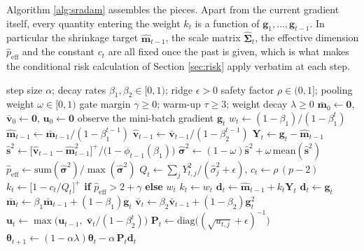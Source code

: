 \documentclass[a4paper,fleqn]{cas-dc}
\theoremstyle{plain}
\theoremstyle{definition}
\theoremstyle{remark}
\newcommand{\peff}{p_{\mathrm{eff}}}
\newcommand{\diag}{\mathrm{diag}}
\begin{document}
Algorithm \ref{alg:sradam} assembles the pieces. Apart from the current gradient itself, every quantity entering the weight $k_t$ is a function of $\bm g_1,\dots,\bm g_{t-1}$. In particular the shrinkage target $\hat{\bm m}_{t-1}$, the scale matrix $\widehat{\bm\Sigma}_t$, the effective dimension $\hat\peff$ and the constant $c_t$ are all fixed once the past is given, which is what makes the conditional risk calculation of Section \ref{sec:risk} apply verbatim at each step.

\begin{algorithm*}[t]
\caption{SR-Adam, applied blockwise}
\label{alg:sradam}
\begin{algorithmic}[1]
\Require step size $\alpha$; decay rates $\beta_1,\beta_2\in[0,1)$; ridge $\epsilon>0$
\Statex \hspace{1.2em} safety factor $\rho\in(0,1]$; pooling weight $\omega\in[0,1)$
\Statex \hspace{1.2em} gate margin $\gamma\ge0$; warm-up $\tau\ge3$; weight decay $\lambda\ge0$
\State $\bar{\bm m}_0\gets\bm 0$, $\bar{\bm v}_0\gets\bm 0$, $\bm u_0\gets\bm 0$
  \State observe the mini-batch gradient $\bm g_t$
  \State $w_t\gets(1-\beta_1)/(1-\beta_1^{t})$ 
    \State $\hat{\bm m}_{t-1}\gets\bar{\bm m}_{t-1}/(1-\beta_1^{t-1})$
    \State $\hat{\bm v}_{t-1}\gets\bar{\bm v}_{t-1}/(1-\beta_2^{t-1})$
    \State $\bm Y_t\gets\bm g_t-\hat{\bm m}_{t-1}$
      \State $\hat{\bm s}^2\gets\bigl[\hat{\bm v}_{t-1}-\hat{\bm m}_{t-1}^{2}\bigr]^{+}\big/\bigl(1-\phi_{t-1}(\beta_1)\bigr)$ 
      \State $\hat{\bm\sigma}^2\gets(1-\omega)\hat{\bm s}^2+\omega\,\mathrm{mean}(\hat{\bm s}^2)$ 
      \State $\hat\peff\gets\mathrm{sum}(\hat{\bm\sigma}^2)\big/\max(\hat{\bm\sigma}^2)$
      \State $Q_t\gets\sum_{j}Y^2_{t,j}/(\hat\sigma^2_{j}+\epsilon)$, \quad $c_t\gets\rho\,(p-2)$
      \State $k_t\gets\bigl[1-c_t/Q_t\bigr]^{+}$ \textbf{if} $\hat\peff>2+\gamma$ \textbf{else} $w_t$
    \Else
      \State $k_t\gets w_t$
    \EndIf
    \State $\bm d_t\gets\hat{\bm m}_{t-1}+k_t\bm Y_t$
  \Else
    \State $\bm d_t\gets\bm g_t$
  \EndIf
  \State $\bar{\bm m}_t\gets\beta_1\bar{\bm m}_{t-1}+(1-\beta_1)\bm g_t$
  \State $\bar{\bm v}_t\gets\beta_2\bar{\bm v}_{t-1}+(1-\beta_2)\bm g_t^{2}$
  \State $\bm u_t\gets\max\bigl(\bm u_{t-1},\;\bar{\bm v}_t/(1-\beta_2^{t})\bigr)$ 
  \State $\bm P_t\gets\diag\bigl((\sqrt{u_{t,j}}+\epsilon)^{-1}\bigr)$
  \State $\bm\theta_{t+1}\gets(1-\alpha\lambda)\bm\theta_t-\alpha\,\bm P_t\bm d_t$
\EndFor
\end{algorithmic}
\end{algorithm*}
\end{document}
